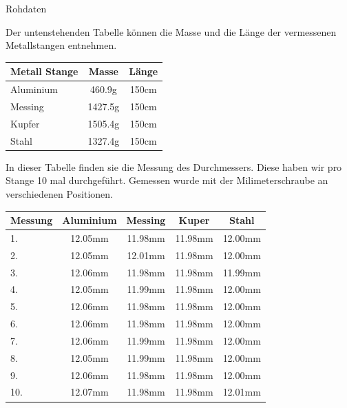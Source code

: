 \documentclass[twoside]{protokoll}
\begin{document}
\begin{aufgabe}{Rohdaten}

Der untenstehenden Tabelle können die Masse und die Länge der vermessenen Metallstangen entnehmen.  
    \begin{table}[h]
        \centering
        \begin{tabularx}{0.8\textwidth}{X c c} %
            \toprule
            \textbf{Metall Stange} & \textbf{Masse} & \textbf{Länge} \\
            \midrule
            Aluminium & 460.9g & 150cm \\
            Messing & 1427.5g & 150cm \\
            Kupfer & 1505.4g & 150cm \\
            Stahl & 1327.4g & 150cm \\
            \bottomrule
        \end{tabularx}
        \label{tab:mytable}
    \end{table}

In dieser Tabelle finden sie die Messung des Durchmessers. Diese haben wir pro Stange 10 mal durchgeführt. Gemessen wurde mit der Milimeterschraube an verschiedenen Positionen.
    \begin{table}[h]
        \centering
        \begin{tabularx}{0.8\textwidth}{X c c c c} %
            \toprule
            \textbf{Messung} & \textbf{Aluminium} & \textbf{Messing} & \textbf{Kuper} & \textbf{Stahl} \\
            \midrule
            1. & 12.05mm & 11.98mm & 11.98mm & 12.00mm \\
            2. & 12.05mm & 12.01mm & 11.98mm & 12.00mm \\
            3. & 12.06mm & 11.98mm & 11.98mm & 11.99mm \\
            4. & 12.05mm & 11.99mm & 11.98mm & 12.00mm \\
            5. & 12.06mm & 11.98mm & 11.98mm & 12.00mm \\
            6. & 12.06mm & 11.98mm & 11.98mm & 12.00mm \\
            7. & 12.06mm & 11.99mm & 11.98mm & 12.00mm \\
            8. & 12.05mm & 11.99mm & 11.98mm & 12.00mm \\
            9. & 12.06mm & 11.98mm & 11.98mm & 12.00mm \\
            10.& 12.07mm & 11.98mm & 11.98mm & 12.01mm \\
            \bottomrule
        \end{tabularx}
        \label{tab:mytable}
    \end{table}

\end{aufgabe}
\end{document}
